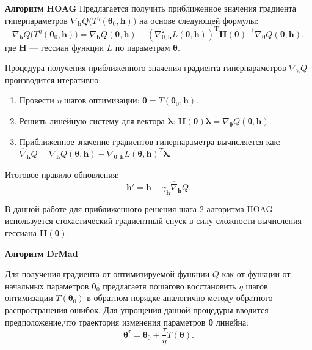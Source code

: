 \textbf{Алгоритм HOAG}
Предлагается получить приближенное значения градиента гиперпараметров $\nabla_{\mathbf{h}} Q \bigl(T^\eta(\boldsymbol{\theta}_0, \mathbf{h})\bigr)$ на основе следующей формулы:
\[
\nabla_{\mathbf{h}} Q \bigl(T^\eta(\boldsymbol{\theta}_0, \mathbf{h})\bigr) = \nabla_{\mathbf{h}} Q(\boldsymbol{\theta}, \mathbf{h}) - (\nabla^2_{\boldsymbol{\theta}, \mathbf{h}} L(\boldsymbol{\theta}, \mathbf{h}))^\text{T}\mathbf{H}(\boldsymbol{\theta})^{-1}\nabla_{\boldsymbol{\theta}} Q(\boldsymbol{\theta}, \mathbf{h}),
\]
где $\mathbf{H}$ --- гессиан функции $L$ по параметрам $\boldsymbol{\theta}$.

Процедура получения приближенного значения градиента гиперпараметров $\nabla_{\mathbf{h}} Q$  производится итеративно:
\begin{enumerate}
\item Провести $\eta$ шагов оптимизации: $\boldsymbol{\theta} = T(\boldsymbol{\theta}_0, \mathbf{h})$.
\item Решить линейную систему для вектора $\boldsymbol{\lambda}$: $\mathbf{H}(\boldsymbol{\theta})\boldsymbol{\lambda} =  \nabla_{\boldsymbol{\theta}} Q(\boldsymbol{\theta}, \mathbf{h})$.
\item Приближенное значение градиентов гиперпараметра вычисляется как: $\hat{\nabla}_{\mathbf{h}}Q = \nabla_{\mathbf{h}}Q(\boldsymbol{\theta}, \mathbf{h}) -\nabla_{\boldsymbol{\theta}, \mathbf{h}} L(\boldsymbol{\theta}, \mathbf{h})^T\boldsymbol{\lambda}$.
\end{enumerate}

Итоговое правило обновления:
\begin{equation}
\label{eq:update_hyper}
\mathbf{h}' = \mathbf{h} - \gamma_{\mathbf{h}} \hat{\nabla}_{\mathbf{h}}Q.
\end{equation}

В данной работе для приближенного решения  шага 2 алгоритма HOAG используется стохастический градиентный спуск в силу сложности вычисления гессиана $\mathbf{H}(\boldsymbol{\theta})$.


\textbf{Алгоритм DrMad}

Для получения градиента от оптимизируемой функции $Q$ как от функции от начальных параметров $\boldsymbol{\theta}_0$ предлагаетя пошагово восстановить $\eta$ шагов оптимизации $T(\boldsymbol{\theta}_0)$ в обратном порядке аналогично методу обратного распространения ошибок. Для упрощения данной процедуры вводится предположение,что траектория изменения параметров $\boldsymbol{\theta}$ линейна:
\begin{equation}
\label{eq:mad_lin}
\boldsymbol{\theta}^\tau = \boldsymbol{\theta}_0 + \frac{\tau}{\eta} T(\boldsymbol{\theta}).
\end{equation}


